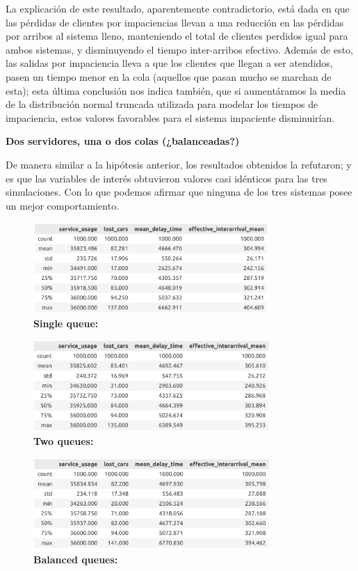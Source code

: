 \documentclass[14pt]{extarticle}
\begin{document}
La explicación de este resultado, aparentemente contradictorio, está dada en que las pérdidas de clientes por impaciencias llevan a una reducción en las pérdidas por arribos al sistema lleno, manteniendo el total de clientes perdidos igual para ambos sistemas, y disminuyendo el tiempo inter-arribos efectivo. Además de esto, las salidas por impaciencia lleva a que los clientes que llegan a ser atendidos, pasen un tiempo menor en la cola (aquellos que pasan mucho se marchan de esta); esta última conclusión nos indica también, que si aumentáramos la media de la distribución normal truncada utilizada para modelar los tiempos de impaciencia, estos valores favorables para el sistema impaciente disminuirían.

\textbf{Dos servidores, una o dos colas (¿balanceadas?)}

De manera similar a la hipótesis anterior, los resultados obtenidos la refutaron; y es que las variables de interés obtuvieron valores casi idénticos para las tres simulaciones. Con lo que podemos afirmar que ninguna de los tres sistemas posee un mejor comportamiento.

\begin{figure}[htbp]
    \centering
    \includegraphics[width=0.8\textwidth]{./single_queue.png}
   \caption{\textbf{Single queue:}}
  \end{figure}

  \begin{figure}[htbp]
    \centering
    \includegraphics[width=0.8\textwidth]{./two_queues.png}
   \caption{\textbf{Two queues:}}
  \end{figure}

  \begin{figure}[htbp]
    \centering
    \includegraphics[width=0.8\textwidth]{./balanced_queues.png}
   \caption{\textbf{Balanced queues:}}
  \end{figure}
\end{document}
